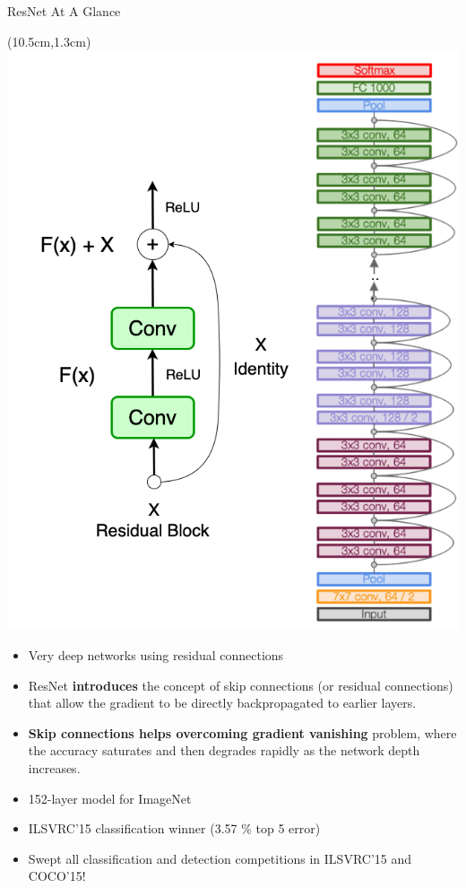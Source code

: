 \documentclass[serif, aspectratio=169]{beamer}
\begin{document}
\begin{frame}{ResNet At A Glance}
	
	\begin{textblock*}{5cm}(10.5cm,1.3cm) %
		\includegraphics[keepaspectratio, scale=0.23]{pic/resBlock}
	\end{textblock*}
	
	\begin{itemize}
		\item {\color{red} Very deep networks using residual connections}
		\item ResNet \textbf{introduces} the concept of {\color{red}skip connections \newline (or residual connections)} that allow the gradient to \newline be directly backpropagated to earlier layers.
		\item \textbf{Skip connections helps overcoming gradient vanishing} \newline problem, where the accuracy saturates and then \newline degrades rapidly as the network depth increases.
		\item 152-layer model for ImageNet
		\item ILSVRC’15 classification winner (3.57 \% top 5 error)
		\item Swept all classification and detection competitions \newline in ILSVRC’15 and COCO’15!
	\end{itemize}
\end{frame}
\end{document}
